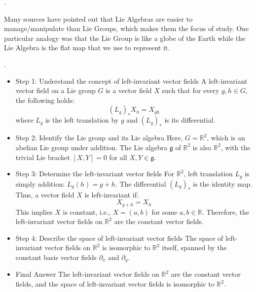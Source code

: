 \documentclass[12pt,a4paper]{report}
\begin{document}
\begin{remark}.

Many sources have pointed out that Lie Algebras are easier to manage/manipulate than Lie Groups, which makes them the focus of study.  One particular analogy was that the Lie Group is like a globe of the Earth while the Lie Algebra is the flat map that we use to represent it.

\end{remark}
\HLINE
\begin{remark}.

\begin{itemize}
\item Step 1: Understand the concept of left-invariant vector fields  
A left-invariant vector field on a Lie group \( G \) is a vector field \( X \) such that for every \( g, h \in G \), the following holds:  
\[ (L_g)_* X_h = X_{gh} \]  
where \( L_g \) is the left translation by \( g \) and \( (L_g)_* \) is its differential.  

\item Step 2: Identify the Lie group and its Lie algebra  
Here, \( G = \mathbb{R}^2 \), which is an abelian Lie group under addition. The Lie algebra \( \mathfrak{g} \) of \( \mathbb{R}^2 \) is also \( \mathbb{R}^2 \), with the trivial Lie bracket \([X, Y] = 0\) for all \( X, Y \in \mathfrak{g} \).  

\item Step 3: Determine the left-invariant vector fields  
For \( \mathbb{R}^2 \), left translation \( L_g \) is simply addition: \( L_g(h) = g + h \). The differential \( (L_g)_* \) is the identity map. Thus, a vector field \( X \) is left-invariant if:  
\[ X_{g + h} = X_h \]  
This implies \( X \) is constant, i.e., \( X = (a, b) \) for some \( a, b \in \mathbb{R} \). Therefore, the left-invariant vector fields on \( \mathbb{R}^2 \) are the constant vector fields.  

\item Step 4: Describe the space of left-invariant vector fields  
The space of left-invariant vector fields on \( \mathbb{R}^2 \) is isomorphic to \( \mathbb{R}^2 \) itself, spanned by the constant basis vector fields \( \partial_x \) and \( \partial_y \).
\item Final Answer
The left-invariant vector fields on \(\mathbb{R}^2\) are the constant vector fields, and the space of left-invariant vector fields is isomorphic to \(\mathbb{R}^2\).

\end{itemize}

\end{remark}
\end{document}
